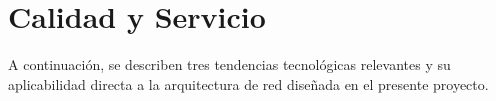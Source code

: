 \section{Calidad y Servicio}
	A continuación, se describen tres tendencias tecnológicas relevantes y su aplicabilidad directa a la arquitectura de red diseñada en el presente proyecto.


